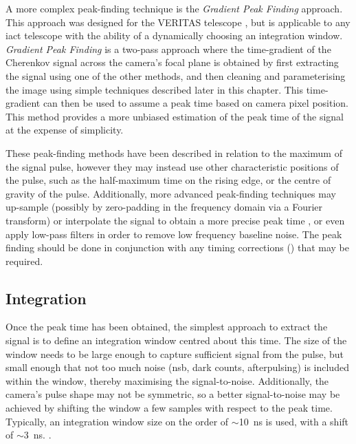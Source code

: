 A more complex peak-finding technique is the \textit{Gradient Peak Finding} approach. This approach was designed for the VERITAS telescope \cite{Holder2005}\cite{Cogan2006}\cite{Cogan2007}, but is applicable to any \gls{iact} telescope with the ability of a dynamically choosing an integration window. \textit{Gradient Peak Finding} is a two-pass approach where the time-gradient of the Cherenkov signal across the camera's focal plane is obtained by first extracting the signal using one of the other methods, and then cleaning and parameterising the image using simple techniques described later in this chapter. This time-gradient can then be used to assume a peak time based on camera pixel position. This method provides a more unbiased estimation of the peak time of the signal at the expense of simplicity. 

These peak-finding methods have been described in relation to the maximum of the signal pulse, however they may instead use other characteristic positions of the pulse, such as the half-maximum time on the rising edge, or the centre of gravity of the pulse. Additionally, more advanced peak-finding techniques may up-sample (possibly by zero-padding in the frequency domain via a Fourier transform) or interpolate the signal to obtain a more precise peak time \cite{Cogan2006}\cite{Cogan2007}, or even apply low-pass filters in order to remove low frequency baseline noise. The peak finding should be done in conjunction with any timing corrections () that may be required.


\subsection{Integration}

Once the peak time has been obtained, the simplest approach to extract the signal is to define an integration window centred about this time. The size of the window needs to be large enough to capture sufficient signal from the pulse, but small enough that not too much noise (\gls{nsb}, dark counts, afterpulsing) is included within the window, thereby maximising the signal-to-noise. Additionally, the camera's pulse shape may not be symmetric, so a better signal-to-noise may be achieved by shifting the window a few samples with respect to the peak time. Typically, an integration window size on the order of $\sim$10~ns is used, with a shift of $\sim$3~ns.  .

